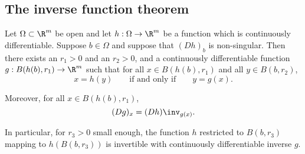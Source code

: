 \subsection{The inverse function theorem}
\begin{theorem}
    Let $\Omega \subset \R^m$ be open and let $h: \Omega \to \R^m$ be a function which is continuously differentiable.
    Suppose $b \in \Omega$ and suppose that $(Dh)_b$ is non-singular. Then there exists an $r_1 > 0$ and an $r_2 >0$,
    and a continuously differentiable function $g: B(h(b),r_1) \to \R^m$ such that for all $x \in B(h(b),r_1)$
    and all $y \in B(b,r_2)$,
    $$x = h(y) \qquad \text{if and only if} \qquad y=g(x).$$

    Moreover, for all $x \in B(h(b),r_1)$,
    $$(Dg)_x=(Dh)\inv_{g(x)}.$$

    In particular, for $r_3 > 0$ small enough, the function $h$ restricted to $B(b,r_3)$ mapping to $h(B(b,r_3))$
    is invertible with continuously differentiable inverse $g$.
\end{theorem}
